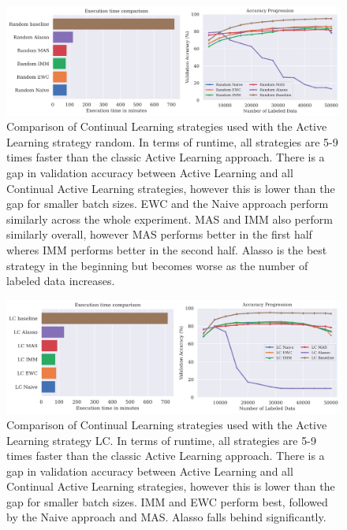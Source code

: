 \begin{figure} [ht]
    \centering
    \includegraphics[width=\linewidth]{images/results_CAL/Random_CAL_4000b.png}
    \caption[Continual Active Learning Random 4000 batch size]{Comparison of Continual Learning strategies used with the Active Learning strategy random. In terms of runtime, all
    strategies are 5-9 times faster than the classic Active Learning approach. There is a gap in validation accuracy between Active Learning and all Continual
    Active Learning strategies, however this is lower than the gap for smaller batch sizes. EWC and the Naive approach perform similarly across the whole experiment. MAS and IMM
    also perform similarly overall, however MAS performs better in the first half wheres IMM performs better in the second half. Alasso is the best strategy in the beginning but 
    becomes worse as the number of labeled data increases.}
    \label{fig:Evaluation:Results:CAL:Random4000}
\end{figure}

\begin{figure} [ht]
    \centering
    \includegraphics[width=\linewidth]{images/results_CAL/LC_CAL_4000b.png}
    \caption[Continual Active Learning Random 4000 batch size]{Comparison of Continual Learning strategies used with the Active Learning strategy LC. In terms of runtime, all
    strategies are 5-9 times faster than the classic Active Learning approach. There is a gap in validation accuracy between Active Learning and all Continual
    Active Learning strategies, however this is lower than the gap for smaller batch sizes. IMM and EWC perform best, followed by the Naive approach and MAS. Alasso falls behind
    significantly.}
    \label{fig:Evaluation:Results:CAL:LC4000}
\end{figure}

